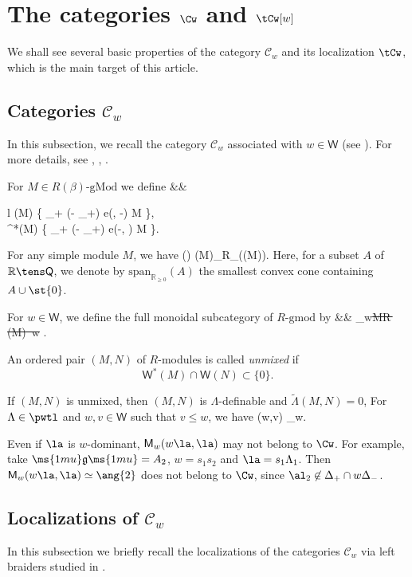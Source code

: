 \documentclass[12pt,leqno]{amsart}%
\renewcommand{\le}{\leqslant}
\renewcommand{\ge}{\geqslant}
\theoremstyle{plain}
\theoremstyle{definition}
\newcommand{\R}{{\mathbb R}}
\newcommand{\seteq}{\mathbin{:=}}
\newcommand{\Sp}{\mathrm{span}_{\R_{\ge0}}}  	%
\newcommand{\g}{\ms{1mu}\mathfrak{g}\ms{1mu}}
\newcommand{\gmod}{\text{-}\mathrm{gmod}}
\newcommand{\gMod}{\text{-}\mathrm{gMod}}
\newcommand{\rlQ}{\mathsf{Q}}   %
\newcommand{\weyl}{\mathsf{W}}  %
\newcommand{\prD}{\Delta_+}            %
\newcommand{\nrD}{\Delta_-}            %
\newcommand{\catC}{ \mathscr{C}}  	%
\newcommand{\dM}{ \mathsf{M }}              %
\newcommand{\gW}{\mathsf{W}}
\newcommand{\sgW}{\mathsf{W}^*}
\newcommand{\La}{\Lambda} 			%
\newcommand{\tLa}{\widetilde{\Lambda}} 			%
\newcommand{\Mm}{{\mathsf{M}}}
\newcommand{\rtl}{\rlQ}
\newenvironment{myarray}[1]{\relax\setlength{\arraycolsep}{1pt}
\renewcommand{\arraystretch}{1.2}%
\begin{array}{#1}}{\end{array}\relax}
\newcommand{\ba}{\begin{myarray}}
\newcommand{\ea}{\end{myarray}}
\numberwithin{equation}{section}
\begin{document}
\section{The categories $\Cw$ and $\tCw[{w}]$}\label{sec:cat-C}

We shall see several basic properties of the category $\catC_{w}$ and its localization $\tCw$, which is 
the main target of this article.
\subsection{Categories $\catC_{w}$} \label{Sec: Cwv}
In this subsection, we recall  the category $\catC_w$
associated with $w\in\weyl$ (see \cite{KKOP18} ). For more details, see
\cite{KKOP21}, \cite{KKOP22}, \cite{KKOP23}.

For $M\in R(\beta) \gMod$ we define
\eqn
&&\ba{l}
\gW(M) \seteq  \{  \gamma \in  \rlQ_+ \cap (\beta - \rlQ_+)  \mid  e(\gamma, \beta-\gamma) M   \}, \\
\gW^*(M) \seteq  \{  \gamma \in  \rlQ_+ \cap (\beta - \rlQ_+)  \mid  e(\beta-\gamma, \gamma) M   \}.
\ea
\eneqn

For any simple module $M$, we have (\cite{TW16})
\eq
\gW(M)\subset \Sp(\gW(M)\cap\prt).\eneq
Here, for a subset $A$ of $\R\tens\rtl$, we denote by $\Sp(A)$
the smallest convex cone containing $A\cup\st{0}$.

For $w\in\weyl$,  we define the full monoidal subcategory of $R\gmod$
by
\eq
&&
\catC_w\seteq\st{M\in R\gmod\Mid \W\,(M)\subset\prtl\cap\, w\nrtl} .
\label{def:Cw}
\eneq

%
An ordered pair $(M,N)$ of $R$-modules is called {\em unmixed}
if $$\sgW(M)\cap\gW(N)\subset\{0\}.$$

\label{lem:unm}
If $(M,N)$ is unmixed, then $(M,N)$ is $\La$-definable and
$\tLa(M,N)=0$,
\enlemma
%
For $\La \in \pwtl$ and $w, v\in \weyl$ such that $v\le w$, we have
\eq
\dM(w\La,v\La) \in \catC_w.
\label{det-in-C}
\eneq

\Rem
Even if $\la$ is $w$-dominant, $\Mm_w(w\la,\la)$ may not belong to 
$\Cw$.
For example, take $\g=A_2$, $w=s_1s_2$ and $
\la=s_1\La_1$.
Then $\Mm_w(w\la,\la)\simeq \ang{2}$ does not belong to $\Cw$,
since
$\al_2\not\in\prD\cap w\nrD$.
\enrem



\subsection{Localizations of $\catC_{w}$} 
\label{subsec:locCw}
In this subsection we briefly recall  the localizations of the categories $\catC_{w}$ via left braiders studied in \cite{KKOP21, KKOP22}.
\end{document}

